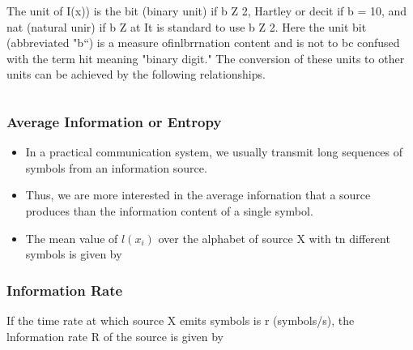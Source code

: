 \documentclass[a4]{beamer}
\begin{document}
\begin{frame}
The unit of I(x)) is the bit (binary unit) if b Z 2, Hartley or decit if b = 10, and nat (natural unir) if
b Z at It is standard to use b Z 2. Here the unit bit (abbreviated "b“) is a measure ofinlbrrnation
content and is not to bc confused with the term hit meaning "binary digit." The conversion of these
units to other units can be achieved by the following relationships.

\[   \]
\end{frame}
\begin{frame}
\frametitle{Average Information or Entropy}
\begin{itemize}
\item In a practical communication system, we usually transmit long sequences of symbols from an
information source. \item Thus, we are more interested in the average infornation that a source produces
than the information content of a single symbol.
\item The mean value of $ l(x_i)$ over the alphabet of source X with tn different symbols is given by
\[ \]
\end{itemize}
\end{frame}




\begin{frame}
\frametitle{Information Rate}
If the time rate at which source X emits symbols is r (symbols/s), the lnformation rate R of the
source is given by


\end{frame}
\end{document}
